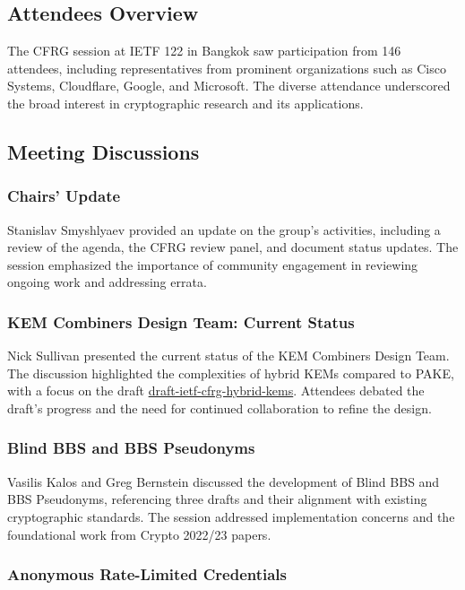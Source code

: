 \documentclass{article}
\begin{document}
\subsection{Attendees Overview}

The CFRG session at IETF 122 in Bangkok saw participation from 146 attendees, including representatives from prominent organizations such as Cisco Systems, Cloudflare, Google, and Microsoft. The diverse attendance underscored the broad interest in cryptographic research and its applications.

\subsection{Meeting Discussions}

\subsubsection{Chairs' Update}

Stanislav Smyshlyaev provided an update on the group's activities, including a review of the agenda, the CFRG review panel, and document status updates. The session emphasized the importance of community engagement in reviewing ongoing work and addressing errata.

\subsubsection{KEM Combiners Design Team: Current Status}

Nick Sullivan presented the current status of the KEM Combiners Design Team. The discussion highlighted the complexities of hybrid KEMs compared to PAKE, with a focus on the draft \href{https://datatracker.ietf.org/doc/html/draft-ietf-cfrg-hybrid-kems}{draft-ietf-cfrg-hybrid-kems}. Attendees debated the draft's progress and the need for continued collaboration to refine the design.

\subsubsection{Blind BBS and BBS Pseudonyms}

Vasilis Kalos and Greg Bernstein discussed the development of Blind BBS and BBS Pseudonyms, referencing three drafts and their alignment with existing cryptographic standards. The session addressed implementation concerns and the foundational work from Crypto 2022/23 papers.

\subsubsection{Anonymous Rate-Limited Credentials}
\end{document}
